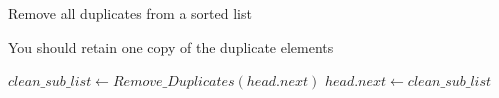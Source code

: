 \documentclass[12pt]{article}
\begin{document}
\begin{algorithm}

  \caption{Remove all duplicates from a sorted list }
  
  \begin{algorithmic}[1]
    \Ensure You should retain one copy of the duplicate elements
    \Statex
    
    
            \State {}
        \EndIf
        
        \Statex
        \Statex
        
        \State $clean\_sub\_list \gets Remove\_Duplicates(head.next)$
        \State $head.next \gets clean\_sub\_list$
        \Statex
        
            \State {}
        \Else
            \State {}
            
        \EndIf
    \EndFunction
  \end{algorithmic}
  
\end{algorithm}
\end{document}
